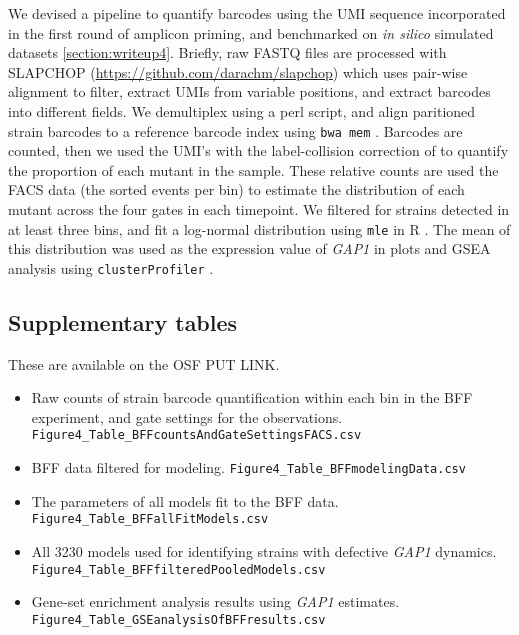 {We devised a pipeline to quantify barcodes using the UMI sequence 
incorporated in the first round of
amplicon priming, and benchmarked on \textit{in silico}
simulated datasets \autoref{section:writeup4}.
Briefly, raw FASTQ files are processed with SLAPCHOP
(\url{https://github.com/darachm/slapchop}) 
which uses pair-wise alignment
\parencite{cock2009biopython} to filter, extract UMIs from 
variable positions, and extract barcodes into different fields.
We demultiplex using a perl script, and align paritioned
strain barcodes to a reference barcode index
\cite{smith2009quantitative}
using \texttt{bwa mem} \cite{li2013aligning}. Barcodes are counted,
then we used the UMI's with the label-collision correction of 
\cite{fu2011counting} to quantify the proportion of each mutant in the
sample. These relative counts are used the FACS data
(the sorted events per bin) to estimate the distribution 
of each mutant across the four gates in each timepoint.
We filtered for strains detected in at least three bins,
and fit a log-normal distribution using \texttt{mle} in R
\cite{team2000r}. The mean of this distribution
was used as the expression value of \textit{GAP1} in plots and
GSEA analysis using \texttt{clusterProfiler}
\parencite{yu2012clusterprofiler}.

\subsection{Supplementary tables}
These are available on the OSF PUT LINK.
\begin{itemize}
  \item Raw counts of strain barcode quantification within each bin
    in the BFF experiment, and gate settings for the observations.
    \texttt{Figure4\_Table\_BFFcountsAndGateSettingsFACS.csv}
    \label{itm:dme209rawCountsGates}
  \item BFF data filtered for modeling.
    \texttt{Figure4\_Table\_BFFmodelingData.csv}
    \label{itm:dme209modelData}
  \item The parameters of all models fit to the BFF data.
    \texttt{Figure4\_Table\_BFFallFitModels.csv}
    \label{itm:dme209allFits}
  \item All 3230 models used for identifying strains with defective 
    \textit{GAP1} dynamics.
    \texttt{Figure4\_Table\_BFFfilteredPooledModels.csv}
    \label{itm:dme209pooledFits}
  \item Gene-set enrichment analysis results using \textit{GAP1} 
    estimates.
    \texttt{Figure4\_Table\_GSEanalysisOfBFFresults.csv}
    \label{itm:dme209gsea}
\end{itemize}


}
